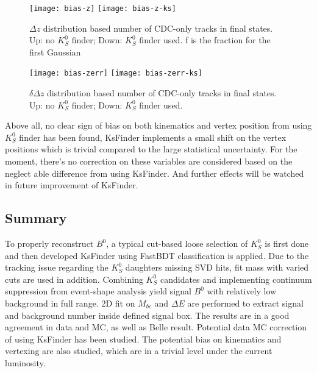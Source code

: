 \begin{figure}[htpb]
	\centering
	\texttt{[image: bias-z]}
	\texttt{[image: bias-z-ks]}
	\caption{$\Delta z$ distribution based number of CDC-only tracks in final states. Up: no $K_S^0$ finder; Down: $K_S^0$ finder used. f is the fraction for the first Gaussian}
\end{figure}
\begin{figure}[htpb]
	\centering
	\texttt{[image: bias-zerr]}
	\texttt{[image: bias-zerr-ks]}
	\caption{$\delta\Delta z$ distribution based number of CDC-only tracks in final states. Up: no $K_S^0$ finder; Down: $K_S^0$ finder used.}
\end{figure}
Above all, no clear sign of bias on both kinematics and vertex position from using $K_S^0$ finder has been found, KsFinder implements a small shift on the vertex positions which is trivial compared to the large statistical uncertainty. For the moment, there's no correction on these variables are considered based on the neglect able difference from using KsFinder. And further effects will be watched in future improvement of KsFinder.

\subsection{Summary}
To properly reconstruct $B^0$, a typical cut-based loose selection of $K_S^0$ is first done and then developed KsFinder using FastBDT classification is applied. Due to the tracking issue regarding the $K_S^0$ daughters missing SVD hits, fit mass with varied cuts are used in addition. Combining $K_S^0$ candidates and implementing continuum suppression from event-shape analysis yield signal $B^0$ with relatively low background in full range. 2D fit on $M_{bc}$ and $\Delta{E}$ are performed to extract signal and background number inside defined signal box. The results are in a good agreement in data and MC, as well as Belle result. Potential data MC correction of using KsFinder has been studied. The potential bias on kinematics and vertexing are also studied, which are in a trivial level under the current luminosity.
